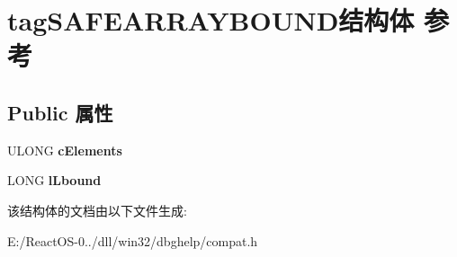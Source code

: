\hypertarget{structtag_s_a_f_e_a_r_r_a_y_b_o_u_n_d}{}\section{tag\+S\+A\+F\+E\+A\+R\+R\+A\+Y\+B\+O\+U\+N\+D结构体 参考}
\label{structtag_s_a_f_e_a_r_r_a_y_b_o_u_n_d}
\subsection*{Public 属性}
\begin{DoxyCompactItemize}
\item 
\mbox{\label{structtag_s_a_f_e_a_r_r_a_y_b_o_u_n_d_a51e987936e3e4cb54457c006aaffca14}} 
U\+L\+O\+NG {\bfseries c\+Elements}
\item 
\mbox{\label{structtag_s_a_f_e_a_r_r_a_y_b_o_u_n_d_aff79b53ea854a46082972c9c896b0b77}} 
L\+O\+NG {\bfseries l\+Lbound}
\end{DoxyCompactItemize}


该结构体的文档由以下文件生成\+:\begin{DoxyCompactItemize}
\item 
E\+:/\+React\+O\+S-\/0../dll/win32/dbghelp/compat.\+h\end{DoxyCompactItemize}
